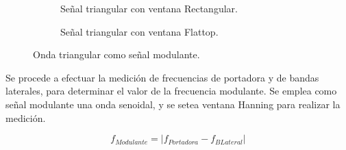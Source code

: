\begin{figure}[H]
\begin{subfigure}[H]{0.48\textwidth}
          \caption{Señal triangular con ventana Rectangular.}
          \label{fig:Exp6SeñalFMModulanteTriangularRectangular}
        \end{subfigure}
       \begin{subfigure}[H]{0.48\textwidth}
          \caption{Señal triangular con ventana Flattop.}
          \label{fig:Exp6SeñalFMModulanteTriangularFlattop}
        \end{subfigure}
        \caption{Onda triangular como señal modulante.}
        \label{fig:Exp6SeñalFMModulanteTriangular}
      \end{figure}         

    Se procede a efectuar la medición de frecuencias de portadora y de bandas 
    laterales, para determinar el valor de la frecuencia modulante. Se emplea como 
    señal modulante una onda senoidal, y se setea ventana Hanning para realizar 
    la medición.

      \begin{equation}
        f_{Modulante}=|f_{Portadora}-f_{BLateral}|
        \label{eqn:Exp6CalculoModulante}
      \end{equation}


